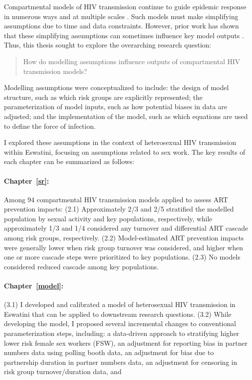Compartmental models of HIV transmission
continue to guide epidemic response in numerous ways and at multiple scales
\cite{Stover2021,Phillips2022,TenBrink2022}.
Such models must make simplifying assumptions due to time and data constraints.
However, prior work has shown that these simplifying assumptions
can sometimes influence key model outputs
\cite{Hontelez2013,Johnson2016mf,Suen2017,Knight2020}.
Thus, this thesis sought to explore the overarching research question:
\begin{quote}
  How do modelling assumptions influence outputs of compartmental HIV transmission models?
\end{quote}
Modelling assumptions were conceptualized to include:
the design of model structure, such as which risk groups are explicitly represented;
the parameterization of model inputs, such as how potential biases in data are adjusted; and
the implementation of the model, such as which equations are used to define the force of infection.
\par
I explored these assumptions in the context of heterosexual HIV transmission within Eswatini,
focusing on assumptions related to sex work.
The key results of each chapter can be summarized as follows:
\newcommand{\chpar}[1]{\paragraph{Chapter~\ref{#1}: \nameref*{#1}}}
\chpar{sr}
Among 94 compartmental HIV transmission models
applied to assess ART prevention impacts:
(2.1) Approximately 2/3 and 2/5 stratified the modelled population
by sexual activity and key populations, respectively, while
approximately 1/3 and 1/4 considered
any turnover and differential ART cascade among risk groups, respectively.
(2.2) Model-estimated ART prevention impacts were generally
lower when risk group turnover was considered, and
higher when one or more cascade steps were prioritized to key populations.
(2.3) No models considered reduced cascade among key populations.
\chpar{model}
(3.1) I developed and calibrated a model of heterosexual HIV transmission in Eswatini
that can be applied to downstream research questions.
(3.2) While developing the model,
I proposed several incremental changes to conventional parameterization steps, including:
a data-driven approach to stratifying higher \vs lower risk female sex workers (FSW),
an adjustment for reporting bias in partner numbers data using polling booth data,
an adjustment for bias due to partnership duration in partner numbers data,
an adjustment for censoring in risk group turnover/duration data, and
